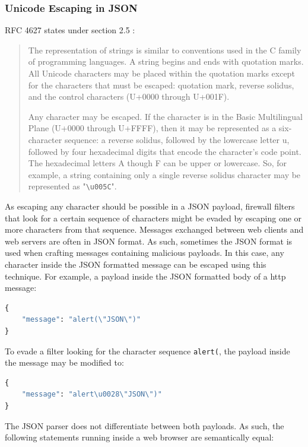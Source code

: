 \subsubsection{Unicode Escaping in JSON}
\label{sec:unicodeinjson}
RFC 4627  states under section 2.5 :
\begin{quote}
	The representation of strings is similar to conventions used in the C
	family of programming languages.  A string begins and ends with
	quotation marks.  All Unicode characters may be placed within the
	quotation marks except for the characters that must be escaped:
	quotation mark, reverse solidus, and the control characters (U+0000
	through U+001F).

	Any character may be escaped.  If the character is in the Basic
	Multilingual Plane (U+0000 through U+FFFF), then it may be
	represented as a six-character sequence: a reverse solidus, followed
	by the lowercase letter u, followed by four hexadecimal digits that
	encode the character's code point.  The hexadecimal letters A though
	F can be upper or lowercase.  So, for example, a string containing
	only a single reverse solidus character may be represented as
	"\verb|\u005C|". \cite{rfc4627}
\end{quote}
As escaping any character should be possible in a JSON payload, firewall filters that look for a certain sequence of characters might be evaded by escaping one or more characters from that sequence. Messages exchanged between web clients and web servers are often in JSON format. As such, sometimes the JSON format is used when crafting messages containing malicious payloads. In this case, any character inside the JSON formatted message can be escaped using this technique. For example, a payload inside the JSON formatted body of a \acrshort{http} message:

\begin{lstlisting}[style=basicStyle, language=Python]
{
	"message": "alert(\"JSON\")"
}
\end{lstlisting}

To evade a filter looking for the character sequence \verb|alert(|, the payload inside the message may be modified to:

\begin{lstlisting}[style=basicStyle, language=Python]
{
	"message": "alert\u0028\"JSON\")"
}
\end{lstlisting}

The JSON parser does not differentiate between both payloads. As such, the following statements running inside a web browser are semantically equal:

